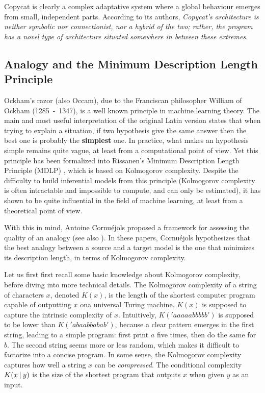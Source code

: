 Copycat is clearly a complex adaptative system where a global behaviour emerges
from small, independent parts. According to its authors, \textit{Copycat's
architecture is neither symbolic nor connectionist, nor a hybrid of the two;
rather, the program has a novel type of architecture situated somewhere in
between these extremes}.

\subsection{Analogy and the Minimum Description Length Principle}

Ockham's razor (also Occam), due to the Franciscan philosopher William
of Ockham (1285~-~1347), is a well known principle in machine learning theory.
The main and most useful interpretation of the original Latin version states
that when trying to explain a situation, if two hypothesis give the same answer
then the best one is probably the \textbf{simplest} one. In practice, what
makes an hypothesis simple remains quite vague, at least from a computational
point of view. Yet this principle has been formalized into Rissanen's Minimum
Description Length Principle (MDLP) \cite{Ris78}, which is based on Kolmogorov
complexity. Despite the difficulty to build inferential models from this
principle (Kolmogorov complexity is often intractable and impossible to
compute, and can only be estimated), it has shown to be quite influential in
the field of machine learning, at least from a theoretical point of view.

With this in mind, Antoine Cornuéjols proposed a framework for assessing the
quality of an analogy \cite{CorMLS96} (see also \cite{CorJFA96}). In these
papers, Cornuéjols hypothesizes that the best analogy between a source and a
target model is the one that minimizes its description length, in terms of
Kolmogorov complexity.

Let us first first recall some basic knowledge about Kolmogorov complexity,
before diving into more technical details. The Kolmogorov complexity of a
string of characters $x$, denoted $K(x)$, is the length of the shortest
computer program capable of outputting $x$ ona universal Turing machine. $K(x)$ is supposed to capture the
intrinsic complexity of $x$. Intuitively, $K('aaaaabbbbb')$ is supposed to be
lower than $K('abaabbabab')$, because a clear pattern emerges in the first
string, leading to a simple program: first print $a$ five times, then do the
same for $b$. The second string seems more or less random, which makes it
difficult to factorize into a concise program. In some sense, the Kolmogorov
complexity captures how well a string $x$ can be \textit{compressed}. The
conditional complexity $K(x \:\vert\: y)$ is the size of the shortest program that
outputs $x$ when given $y$ as an input.


